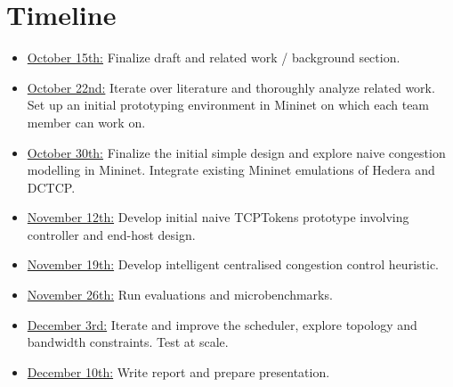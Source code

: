 \section{Timeline}
\label{sec:timeline}
\begin{itemize}
\item \underline{October 15th:} Finalize draft and related work / background section.
\item \underline{ October 22nd:} Iterate over literature and thoroughly analyze related work. Set up an initial prototyping environment in Mininet on which each team member can work on.
\item \underline{October 30th:} Finalize the initial simple design and explore naive congestion modelling in Mininet. Integrate existing Mininet emulations of Hedera and DCTCP.
\item \underline{November 12th:} Develop initial naive TCPTokens prototype involving controller and end-host design.
\item \underline{November 19th:} Develop intelligent centralised congestion control heuristic.
\item \underline{November 26th:} Run evaluations and microbenchmarks.
\item \underline{December 3rd:} Iterate and improve the scheduler, explore topology and bandwidth constraints. Test at scale.
\item \underline{December 10th:} Write report and prepare presentation.
\end{itemize}
